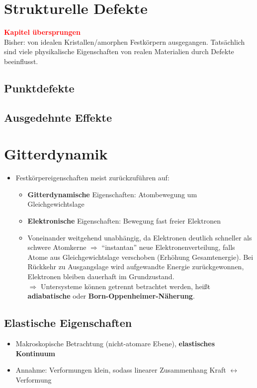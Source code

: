 \documentclass[a4paper,12pt]{article}
\begin{document}
\section{Strukturelle Defekte}
\textcolor{red}{\bf{} Kapitel übersprungen}\\
Bisher: von idealen Kristallen/amorphen Festkörpern ausgegangen. Tatsächlich sind viele physikalische Eigenschaften von realen Materialien durch Defekte beeinflusst.
\subsection{Punktdefekte}
\subsection{Ausgedehnte Effekte}
\section{Gitterdynamik}
\begin{itemize}
	\item Festkörpereigenschaften meist zurückzuführen auf:
	\begin{itemize}
		\item \textbf{Gitterdynamische} Eigenschaften:  Atombewegung um Gleichgewichtslage
		\item \textbf{Elektronische} Eigenschaften: Bewegung fast freier Elektronen
		\item Voneinander weitgehend unabhängig, da Elektronen deutlich schneller als schwere Atomkerne $ \Rightarrow $ \enquote{instantan} neue Elektronenverteilung, falls Atome aus Gleichgewichtslage verschoben (Erhöhung Gesamtenergie). Bei Rückkehr zu Ausgangslage wird aufgewandte Energie zurückgewonnen, Elektronen bleiben dauerhaft im Grundzustand.\\
		$ \Rightarrow $ Untersysteme können getrennt betrachtet werden, heißt \textbf{adiabatische} oder \textbf{Born-Oppenheimer-Näherung}.
	\end{itemize}
\end{itemize}
\subsection{Elastische Eigenschaften}
\begin{itemize}
	\item Makroskopische Betrachtung (nicht-atomare Ebene), \textbf{elastisches Kontinuum}
	\item Annahme: Verformungen klein, sodass linearer Zusammenhang Kraft $ \leftrightarrow $ Verformung
\end{itemize}
\end{document}
